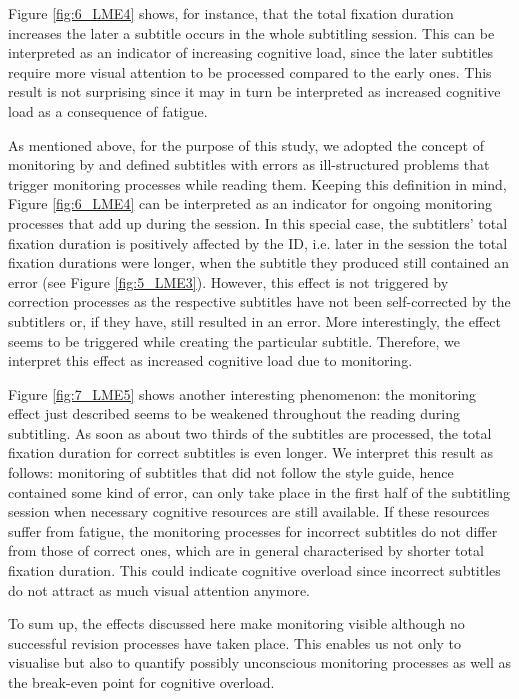 \documentclass[output=paper]{langscibook}
\begin{document}
Figure \ref{fig:6_LME4} shows, for instance, that the total fixation duration increases the later a subtitle occurs in the whole subtitling session.
This can be interpreted as an indicator of increasing cognitive load, since the later subtitles require more visual attention to be processed compared to the early ones.
This result is not surprising since it may in turn be interpreted as increased cognitive load as a consequence of fatigue.

As mentioned above, for the purpose of this study, we adopted the concept of monitoring by \citet{kitchener1983cognition} and defined subtitles with errors as ill-structured problems that trigger monitoring processes while reading them.
Keeping this definition in mind, Figure \ref{fig:6_LME4} can be interpreted as an indicator for ongoing monitoring processes that add up during the session.
In this special case, the subtitlers' total fixation duration is positively affected by the ID, i.e. later in the session the total fixation durations were longer, when the subtitle they produced still contained an error (see Figure \ref{fig:5_LME3}).
However, this effect is not triggered by correction processes as the respective subtitles have not been self-corrected by the subtitlers or, if they have, still resulted in an error.
More interestingly, the effect seems to be triggered while creating the particular subtitle.
Therefore, we interpret this effect as increased cognitive load due to monitoring.

Figure \ref{fig:7_LME5} shows another interesting phenomenon: the monitoring effect just described seems to be weakened throughout the reading during subtitling.
As soon as about two thirds of the subtitles are processed, the total fixation duration for correct subtitles is even longer.
We interpret this result as follows: monitoring of subtitles that did not follow the style guide, hence contained some kind of error, can only take place in the first half of the subtitling session when necessary cognitive resources are still available.
If these resources suffer from fatigue, the monitoring processes for incorrect subtitles do not differ from those of correct ones, which are in general characterised by shorter total fixation duration.
This could indicate cognitive overload since incorrect subtitles do not attract as much visual attention anymore.

To sum up, the effects discussed here make monitoring visible although no successful revision processes have taken place.
This enables us not only to visualise but also to quantify possibly unconscious monitoring processes as well as the break-even point for cognitive overload.
\end{document}
